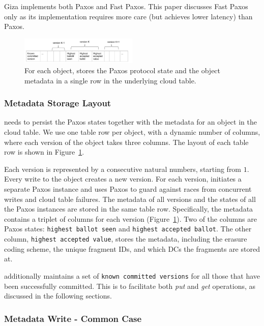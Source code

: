Giza implements both Paxos and Fast Paxos. This paper discusses Fast Paxos only as
its implementation requires more care (but achieves lower latency) than Paxos.

\begin{figure}[tp]
\centering
\includegraphics[width=0.5\textwidth]{fig/Giza_Metadata}
\caption{For each object, \name stores the Paxos protocol state and the object metadata 
in a single row in the underlying cloud table.\label{fig:metadataschema}}
\end{figure}

\subsubsection{Metadata Storage Layout}

\name needs to persist the Paxos states together with the metadata for an object in the cloud table. 
We use one table row per object, with a dynamic number of columns,
where each version of the object takes three columns. The layout of each table row is
shown in Figure~\ref{fig:metadataschema}.

Each version is represented by a consecutive natural numbers, starting
from $1$. Every \name write to the object creates a new version. For each
version, \name initiates a separate Paxos instance and uses Paxos to guard
against races from concurrent writes and cloud table failures.
The metadata of all versions and the states of all the Paxos instances
are stored in the same table row. Specifically, the metadata contains a triplet
of columns for each version (Figure~\ref{fig:metadataschema}). Two
of the columns are Paxos states: {\tt highest ballot seen} and {\tt highest accepted
  ballot}. The other column, {\tt highest accepted value}, stores the metadata,
including the erasure coding scheme, the unique fragment IDs,
and which DCs the fragments are stored at.

{\name} additionally maintains a set of {\tt known committed versions} for all
those that have been successfully committed. This is to facilitate both {\em put}
and {\em get} operations, as discussed in the following sections.

\subsubsection{Metadata Write - Common Case}

